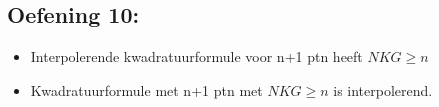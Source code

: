 \documentclass[../Oefenzitting6.tex]{subfiles}
\begin{document}
  \subsection{Oefening 10:}
    \begin{itemize}
      \item Interpolerende kwadratuurformule voor n+1 ptn heeft $NKG \geq n $
      \item Kwadratuurformule met n+1 ptn met $NKG \geq n$ is interpolerend.
    \end{itemize}
\end{document}
